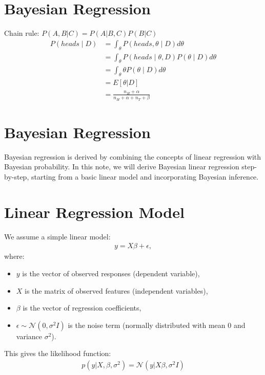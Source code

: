 \section{Bayesian Regression}
\label{sec:regression_bayes}

Chain rule: $P(A,B|C)=P(A|B,C)P(B|C)$
\begin{align*}
	P(heads \mid D) &= \int_{\theta} P(heads, \theta \mid D) d\theta\\ 
					&= \int_{\theta} P(heads \mid \theta, D) P(\theta \mid D) d\theta \\ 
					&= \int_{\theta} \theta P(\theta \mid D) d\theta\\ 
					&= E\left[\theta|D\right]\\ 
					&= \frac{n_H + \alpha}{n_H + \alpha + n_T + \beta}
\end{align*}

\section{Bayesian Regression}

Bayesian regression is derived by combining the concepts of linear regression with Bayesian probability. In this note, we will derive Bayesian linear regression step-by-step, starting from a basic linear model and incorporating Bayesian inference.

\section{Linear Regression Model}

We assume a simple linear model:
\begin{align*}
	y = X\beta + \epsilon,
\end{align*}
where:
\begin{itemize}
    \item $ y $ is the vector of observed responses (dependent variable),
    \item $ X $ is the matrix of observed features (independent variables),
    \item $ \beta $ is the vector of regression coefficients,
    \item $ \epsilon \sim \mathcal{N}(0, \sigma^2 I) $ is the noise term (normally distributed with mean 0 and variance $ \sigma^2 $).
\end{itemize}

This gives the likelihood function:
\begin{align*}
	p(y | X, \beta, \sigma^2) = \mathcal{N}(y | X\beta, \sigma^2 I)
\end{align*}

